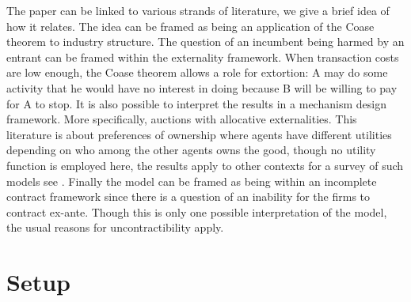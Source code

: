 \documentclass[12pt]{report}
\numberwithin{equation}{section}
\begin{document}
The paper can be linked to various strands of literature, we give a brief idea of how it relates. The idea can be framed as being an application of the Coase theorem to industry structure. The question of an incumbent being harmed by an entrant can be framed within the externality framework. When transaction costs are low enough, the Coase theorem allows a role for extortion: A may do some activity that he would have no interest in doing because B will be willing to pay for A to stop\citep{Kuechle2012}. It is also possible to interpret the results in a mechanism design framework. More specifically, auctions with allocative externalities. This literature is about preferences of ownership where agents have different utilities depending on who among the other agents owns the good, though no utility function is employed here, the results apply to other contexts for a survey of such models see \cite{Jehiel2005}. Finally the model can be framed as being within an incomplete contract framework since there is a question of an inability for the firms to contract ex-ante. Though this is only one possible interpretation of the model, the usual reasons for uncontractibility apply\citep{Hart1999}.
\section{Setup}\label{setup}
\end{document}

